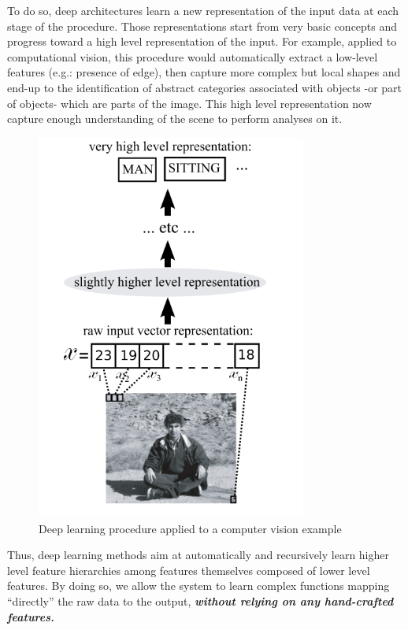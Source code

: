 \documentclass[a4paper,11pt]{report}
\newcommand{\Important}[1]{\textbf{{\em #1}}}
\begin{document}
		To do so, deep architectures learn a new representation of the input data at each stage of the procedure. Those representations start from very basic concepts and progress toward a high level representation of the input. For example, applied to computational vision, this procedure would automatically extract a low-level features (e.g.: presence of edge), then capture more complex but local shapes and end-up to the identification of abstract categories associated with objects -or part of objects- which are parts of the image. This high level representation now capture enough understanding of the scene to perform analyses on it.
  
		\begin{figure}[H]
			\begin{center}
				\includegraphics[width=3.5in]{Images/Introduction/DL_principle.png}
				\caption{Deep learning procedure applied to a computer vision example}
				\label{fig:Example of deep architecture for a computer vision}
			\end{center}
		\end{figure}
  
		Thus, deep learning methods aim at automatically  and recursively learn higher level feature hierarchies among features themselves composed of lower level features. By doing so, we allow the system to learn complex functions mapping ``directly'' the raw data to the output, \Important{without relying on any hand-crafted features.}\\\par 
  
\end{document}

